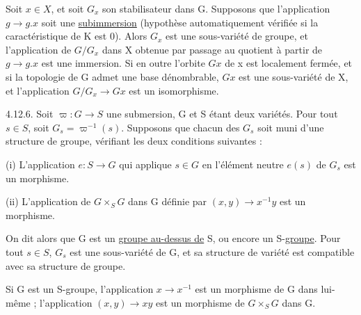Soit $x\in X$, et soit $G_x$ son stabilisateur dans G. Supposons que l'application $g\longrightarrow g.x$ soit une \uline{subimmersion} (hypothèse automatiquement vérifiée si la caractéristique de K est 0). Alors $G_x$ est une sous-variété de groupe, et l'application de $G/G_x$ dans X obtenue par passage au quotient à partir de $g\longrightarrow g.x$ est une immersion. Si en outre l'orbite $Gx$ de x est localement fermée, et si la topologie de G admet une base dénombrable, $Gx$ est une sous-variété de X, et l'application $G/G_x\longrightarrow Gx$ est un isomorphisme.

4.12.6. Soit $\varpi:G\longrightarrow S$ une submersion, G et S étant deux variétés. Pour tout $s\in S$, soit $G_s=\varpi^{-1}(s)$. Supposons que chacun des $G_s$ soit muni d'une structure de groupe, vérifiant les deux conditions suivantes :

(i) L'application $e:S\longrightarrow G$ qui applique $s\in G$ en l'élément neutre $e(s)$ de $G_s$ est un morphisme.

(ii) L'application de $G\times_S G$ dans G définie par $(x,y)\longrightarrow x^{-1}y$ est un morphisme.

On dit alors que G est un \uline{groupe au-dessus de} S, ou encore un S-\uline{groupe}. Pour tout $s\in S$, $G_s$ est une sous-variété de G, et sa structure de variété est compatible avec sa structure de groupe.

Si G est un S-groupe, l'application $x\longrightarrow x^{-1}$ est un morphisme de G dans lui-même ; l'application $(x,y)\longrightarrow xy$ est un morphisme de $G\times_S G$ dans G.

